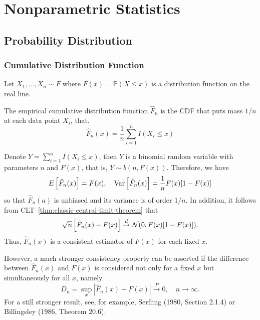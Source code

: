 \chapter{Nonparametric Statistics}

\section{Probability Distribution}

\subsection{Cumulative Distribution Function}

Let \(X_{1},\ldots,X_{n}\sim F\) where \(F(x)=\mathbb{P}(X\leq x)\) is a distribution function on the real line.

\begin{definition}
	The empirical cumulative distribution function \(\widehat{F}_{n}\) is the CDF that puts mass \(1/n\) at each data point \(X_{i}\), that,
	\begin{equation}
		\widehat{F}_{n}(x)=\frac{1}{n}\sum_{i=1}^{n}I\left(X_{i}\leq x\right)
	\end{equation}
\end{definition}

Denote \(Y=\sum_{i=1}^{n}I\left(X_{i}\leq x\right)\), then \(Y\) is a binomial random variable with parameters \(n\) and \(F(x)\), that is, \(Y\sim b(n,F(x))\). Therefore, we have
\begin{equation*}
	E\left[\hat{F}_{n}(x)\right]=F(x),\quad\mathrm{Var}\left[\hat{F}_{n}(x)\right]=\frac{1}{n}F(x)[1-F(x)]
\end{equation*}
so that \(\hat{F}_{n}(a)\) is unbiased and its variance is of order \(1/n\). In addition, it follows from CLT~\eqref{thm:classic-central-limit-theorem} that
\begin{equation*}
	\sqrt{n}\left[\hat{F}_{n}(x)-F(x)\right]\stackrel{d}{\rightarrow}\mathcal{N}(0,F(x)[1-F(x)]).
\end{equation*}
Thus, \(\hat{F}_{n}(x)\) is a consistent estimator of \(F(x)\) for each fixed \(x\).

However, a much stronger consistency property can be asserted if the difference between \(\hat{F}_{n}(x)\) and \(F(x)\) is considered not only for a fixed \(x\) but simultaneously for all \(x\), namely
\begin{equation*}
	D_{n}=\sup _x\left|\hat{F}_{n}(x)-F(x)\right| \xrightarrow{P} 0,\quad n \rightarrow \infty.
\end{equation*}
For a still stronger result, see, for example, Serfling (1980, Section 2.1.4) or Billingsley (1986, Theorem 20.6).

